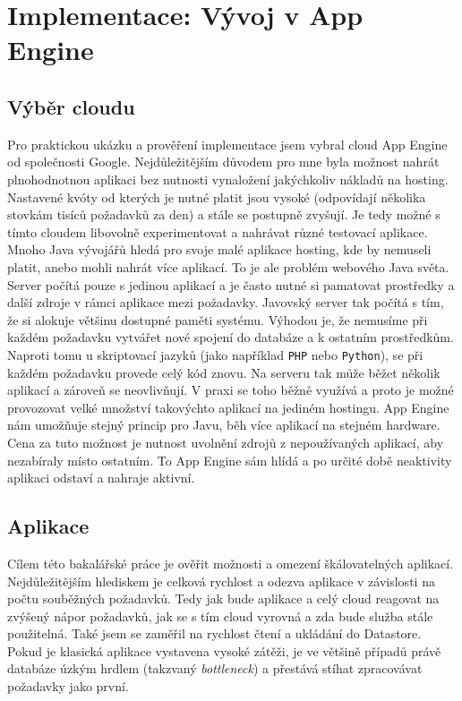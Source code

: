 \chapter{Implementace: Vývoj v App Engine}

\section{Výběr cloudu}
Pro praktickou ukázku a prověření implementace jsem vybral cloud App Engine od společnosti Google. Nejdůležitějším důvodem pro mne byla možnost nahrát plnohodnotnou aplikaci bez nutnosti vynaložení jakýchkoliv nákladů na hosting. Nastavené kvóty od kterých je nutné platit jsou vysoké (odpovídají několika stovkám tisíců požadavků za den) a stále se postupně zvyšují. Je tedy možné s tímto cloudem libovolně experimentovat a nahrávat různé testovací aplikace. Mnoho Java vývojářů hledá pro svoje malé aplikace hosting, kde by nemuseli platit, anebo mohli nahrát více aplikací. To je ale problém webového Java světa. Server počítá pouze s jedinou aplikací a je často nutné si pamatovat prostředky a další zdroje v rámci aplikace mezi požadavky. Javovský server tak počítá s tím, že si alokuje většinu dostupné paměti systému. Výhodou je, že nemusíme při každém požadavku vytvářet nové spojení do databáze a k ostatním prostředkům. Naproti tomu u skriptovací jazyků (jako například \verb|PHP| nebo \verb|Python|), se při každém požadavku provede celý kód znovu. Na serveru tak může běžet několik aplikací a zároveň se neovlivňují. V praxi se toho běžně využívá a proto je možné provozovat velké množství takovýchto aplikací na jediném hostingu. App Engine nám umožňuje stejný princip pro Javu, běh více aplikací na stejném hardware. Cena za tuto možnost je nutnost uvolnění zdrojů z nepoužívaných aplikací, aby nezabíraly místo ostatním. To App Engine sám hlídá a po určité době neaktivity aplikaci odstaví a nahraje aktivní.

\section{Aplikace}
Cílem této bakalářské práce je ověřit možnosti a omezení škálovatelných aplikací. Nejdůležitějším hlediskem je celková rychlost a odezva aplikace v závislosti na počtu souběžných požadavků. Tedy jak bude aplikace a celý cloud reagovat na zvýšený nápor požadavků, jak se s tím cloud vyrovná a zda bude služba stále použitelná. Také jsem se zaměřil na rychlost čtení a ukládání do Datastore. Pokud je klasická aplikace vystavena vysoké zátěži, je ve většině případů právě databáze úzkým hrdlem (takzvaný \emph{bottleneck}) a přestává stíhat zpracovávat požadavky jako první. 

